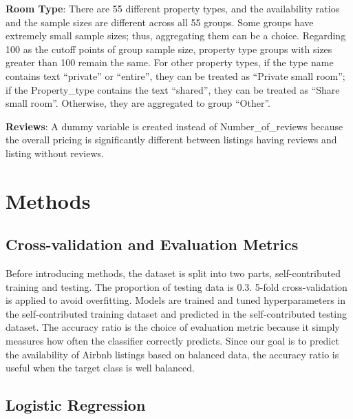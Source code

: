 \documentclass[11pt,]{article}
\begin{document}
\textbf{Room Type}: There are 55 different property types, and the
availability ratios and the sample sizes are different across all 55
groups. Some groups have extremely small sample sizes; thus, aggregating
them can be a choice. Regarding 100 as the cutoff points of group sample
size, property type groups with sizes greater than 100 remain the same.
For other property types, if the type name contains text ``private'' or
``entire'', they can be treated as ``Private small room''; if the
Property\_type contains the text ``shared'', they can be treated as
``Share small room''. Otherwise, they are aggregated to group ``Other''.

\textbf{Reviews}: A dummy variable is created instead of
Number\_of\_reviews because the overall pricing is significantly
different between listings having reviews and listing without reviews.

\hypertarget{methods}{%
\section{Methods}\label{methods}}

\hypertarget{cross-validation-and-evaluation-metrics}{%
\subsection{Cross-validation and Evaluation
Metrics}\label{cross-validation-and-evaluation-metrics}}

Before introducing methods, the dataset is split into two parts,
self-contributed training and testing. The proportion of testing data is
0.3. 5-fold cross-validation is applied to avoid overfitting. Models are
trained and tuned hyperparameters in the self-contributed training
dataset and predicted in the self-contributed testing dataset. The
accuracy ratio is the choice of evaluation metric because it simply
measures how often the classifier correctly predicts. Since our goal is
to predict the availability of Airbnb listings based on balanced data,
the accuracy ratio is useful when the target class is well balanced.

\hypertarget{logistic-regression}{%
\subsection{Logistic Regression}\label{logistic-regression}}
\end{document}
